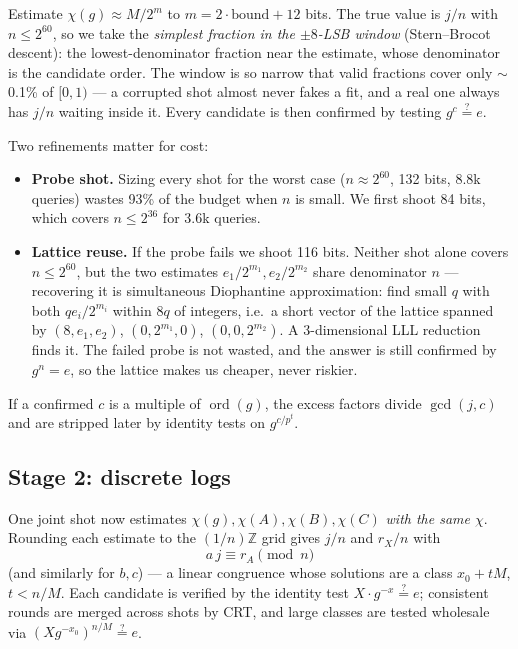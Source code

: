 \documentclass[11pt]{article}
\newcommand{\Z}{\mathbb{Z}}
\theoremstyle{plain}
\theoremstyle{definition}
\begin{document}
Estimate $\chi(g)\approx M/2^m$ to $m=2\cdot\mathrm{bound}+12$ bits. The
true value is $j/n$ with $n\le 2^{60}$, so we take the \emph{simplest
fraction in the $\pm8$-LSB window} (Stern--Brocot descent): the
lowest-denominator fraction near the estimate, whose denominator is the
candidate order. The window is so narrow that valid fractions cover only
$\sim$0.1\% of $[0,1)$ --- a corrupted shot almost never fakes a fit, and
a real one always has $j/n$ waiting inside it. Every candidate is then
confirmed by testing $g^c\stackrel?=e$.

Two refinements matter for cost:

\begin{itemize}[nosep]
  \item \textbf{Probe shot.} Sizing every shot for the worst case
        ($n\approx2^{60}$, 132 bits, 8.8k queries) wastes 93\% of the
        budget when $n$ is small. We first shoot 84 bits, which covers
        $n\le2^{36}$ for 3.6k queries.
  \item \textbf{Lattice reuse.} If the probe fails we shoot 116 bits.
        Neither shot alone covers $n\le2^{60}$, but the two estimates
        $e_1/2^{m_1}, e_2/2^{m_2}$ share denominator $n$ --- recovering it
        is simultaneous Diophantine approximation: find small $q$ with
        both $q e_i/2^{m_i}$ within $8q$ of integers, i.e.\ a short
        vector of the lattice spanned by
        $(8,e_1,e_2)$, $(0,2^{m_1},0)$, $(0,0,2^{m_2})$.
        A 3-dimensional LLL reduction finds it. The failed probe is not
        wasted, and the answer is still confirmed by $g^n=e$, so the
        lattice makes us cheaper, never riskier.
\end{itemize}

If a confirmed $c$ is a multiple of $\operatorname{ord}(g)$, the excess
factors divide $\gcd(j,c)$ and are stripped later by identity tests on
$g^{c/p^t}$.

\subsection{Stage 2: discrete logs}

One joint shot now estimates $\chi(g),\chi(A),\chi(B),\chi(C)$
\emph{with the same $\chi$}. Rounding each estimate to the $(1/n)\Z$
grid gives $j/n$ and $r_X/n$ with
\[
  a\,j \equiv r_A \pmod n
\]
(and similarly for $b,c$) --- a linear congruence whose solutions are a
class $x_0 + tM$, $t<n/M$. Each candidate is verified by the identity
test $X\cdot g^{-x}\stackrel?=e$; consistent rounds are merged across
shots by CRT, and large classes are tested wholesale via
$(Xg^{-x_0})^{n/M}\stackrel?=e$.
\end{document}
